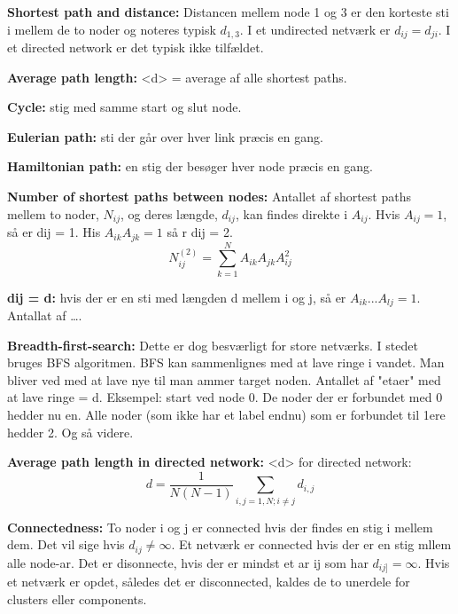 \documentclass[11pt]{article}
\begin{document}
\begin{itemize}
{\item \textbf{Shortest path and distance:} Distancen mellem node 1 og 3 er den korteste sti i mellem de to noder og noteres typisk \(d_{1,3}\). I et undirected netværk er \(d_{ij} = d_{ji}\). I et directed network er det typisk ikke tilfældet.

\item \textbf{Average path length:} <d> = average af alle shortest paths.

\item \textbf{Cycle:} stig med samme start og slut node.

\item \textbf{Eulerian path:} sti der går over hver link præcis en gang.

\item \textbf{Hamiltonian path:} en stig der besøger hver node præcis en gang.

\item \textbf{Number of shortest paths between nodes:} Antallet af shortest paths mellem to noder, \(N_{ij}\), og deres længde, \(d_{ij}\), kan findes direkte i \(A_{ij}\). Hvis \(A_{ij} = 1\), så er dij = 1. His \(A_{ik}A_{jk} = 1\) så r dij = 2. $$ N^{(2)}_{ij} = \sum^N_{k = 1} A_{ik} A_{jk}  A^2_{ij} $$

\item \textbf{dij = d:} hvis der er en sti med længden d mellem i og j, så er \(A_{ik} ... A_{lj} = 1\). Antallat af \ldots{}.

\item \textbf{Breadth-first-search:} Dette er dog besværligt for store netværks. I stedet bruges BFS algoritmen. BFS kan sammenlignes med at lave ringe i vandet. Man bliver ved med at lave nye til man ammer target noden. Antallet af "etaer" med at lave ringe = d. Eksempel: start ved node 0. De noder der er forbundet med 0 hedder nu en. Alle noder (som ikke har et label endnu) som er forbundet til 1ere hedder 2. Og så videre.

\item \textbf{Average path length in directed network:} <d> for directed network: $$ d = \frac{1}{N(N-1)} \sum_{i,j = 1,N; i \neq j} d_{i,j} $$

\item \textbf{Connectedness:} To noder i og j er connected hvis der findes en stig i mellem dem. Det vil sige hvis \(d_{ij} \neq \infty\). Et netværk er connected hvis der er en stig mllem alle node-ar. Det er disonnecte, hvis der er mindst et ar ij som har \(d_{ij]} = \infty\). Hvis et netværk er opdet, således det er disconnected, kaldes de to unerdele for clusters eller components.

}
\end{itemize}
\end{document}
